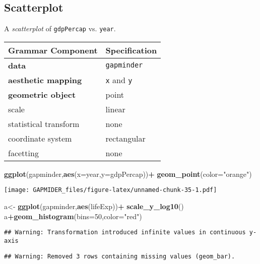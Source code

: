 \documentclass[]{article}
\newenvironment{Shaded}{\begin{snugshade}}{\end{snugshade}}
\newcommand{\DataTypeTok}[1]{\textcolor[rgb]{0.13,0.29,0.53}{#1}}
\newcommand{\DecValTok}[1]{\textcolor[rgb]{0.00,0.00,0.81}{#1}}
\newcommand{\KeywordTok}[1]{\textcolor[rgb]{0.13,0.29,0.53}{\textbf{#1}}}
\newcommand{\NormalTok}[1]{#1}
\newcommand{\OperatorTok}[1]{\textcolor[rgb]{0.81,0.36,0.00}{\textbf{#1}}}
\newcommand{\StringTok}[1]{\textcolor[rgb]{0.31,0.60,0.02}{#1}}
\begin{document}
\hypertarget{scatterplot}{%
\subsection{Scatterplot}\label{scatterplot}}

A \emph{scatterplot} of \texttt{gdpPercap} vs. \texttt{year}.

\begin{longtable}[]{@{}ll@{}}
\toprule
Grammar Component & Specification\tabularnewline
\midrule
\endhead
\textbf{data} & \texttt{gapminder}\tabularnewline
\textbf{aesthetic mapping} & \texttt{x} and \texttt{y}\tabularnewline
\textbf{geometric object} & point\tabularnewline
scale & linear\tabularnewline
statistical transform & none\tabularnewline
coordinate system & rectangular\tabularnewline
facetting & none\tabularnewline
\bottomrule
\end{longtable}

\begin{Shaded}
\begin{Highlighting}[]
\KeywordTok{ggplot}\NormalTok{(gapminder,}\KeywordTok{aes}\NormalTok{(}\DataTypeTok{x=}\NormalTok{year,}\DataTypeTok{y=}\NormalTok{gdpPercap))}\OperatorTok{+}
\StringTok{  }\KeywordTok{geom_point}\NormalTok{(}\DataTypeTok{color=}\StringTok{"orange"}\NormalTok{)}
\end{Highlighting}
\end{Shaded}

\texttt{[image: GAPMIDER\_files/figure-latex/unnamed-chunk-35-1.pdf]}

\begin{Shaded}
\begin{Highlighting}[]
\NormalTok{a<-}\StringTok{ }\KeywordTok{ggplot}\NormalTok{(gapminder,}\KeywordTok{aes}\NormalTok{(lifeExp))}\OperatorTok{+}
\StringTok{  }\KeywordTok{scale_y_log10}\NormalTok{()}
\NormalTok{a}\OperatorTok{+}\KeywordTok{geom_histogram}\NormalTok{(}\DataTypeTok{bins=}\DecValTok{50}\NormalTok{,}\DataTypeTok{color=}\StringTok{"red"}\NormalTok{)}
\end{Highlighting}
\end{Shaded}

\begin{verbatim}
## Warning: Transformation introduced infinite values in continuous y-axis
\end{verbatim}

\begin{verbatim}
## Warning: Removed 3 rows containing missing values (geom_bar).
\end{verbatim}
\end{document}
